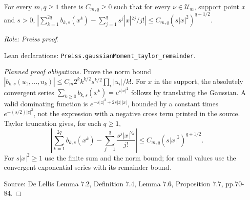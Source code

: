\begin{lemma}
\label{lem:taylor-one}







For every $m,q\geq1$ there is $C_{m,q}\geq0$ such that for every $\nu\in\mathcal U_m$, support point $x$ and $s>0$, $|\sum_{k=1}^{2q} b_{k,s}(x^k)-\sum_{j=1}^q s^j|x|^{2j}/j!|\leq C_{m,q}(s|x|^2)^{q+1/2}$.
\par\emph{Role: Preiss proof.}
\par Lean declarations: \texttt{Preiss.gaussianMoment\_taylor\_remainder}.
\end{lemma}
\begin{proof}[Planned proof obligations]

Prove the norm bound
$|b_{k,s}(u_1,\ldots,u_k)|\leq
C_m 2^k k^{k/2}s^{k/2}\prod_i|u_i|/k!$.
For $x$ in the support, the absolutely convergent series
$\sum_{k\geq0} b_{k,s}(x^k)=e^{s|x|^2}$ follows by translating the
Gaussian. A valid dominating function is
$e^{-s|z|^2+2s|z||x|}$, bounded by a constant times
$e^{-(s/2)|z|^2}$, not the expression with a negative cross term printed in
the source. Taylor truncation gives, for each $q\geq1$,
\[
 \left|\sum_{k=1}^{2q}b_{k,s}(x^k)
 -\sum_{j=1}^{q}\frac{s^j|x|^{2j}}{j!}\right|
 \leq C_{m,q}(s|x|^2)^{q+1/2}.
\]
For $s|x|^2\geq1$ use the finite sum and the norm bound; for small values use
the convergent exponential series with its remainder bound.
\par Source: De Lellis Lemma 7.2, Definition 7.4, Lemma 7.6, Proposition 7.7, pp.70-84.
\end{proof}


